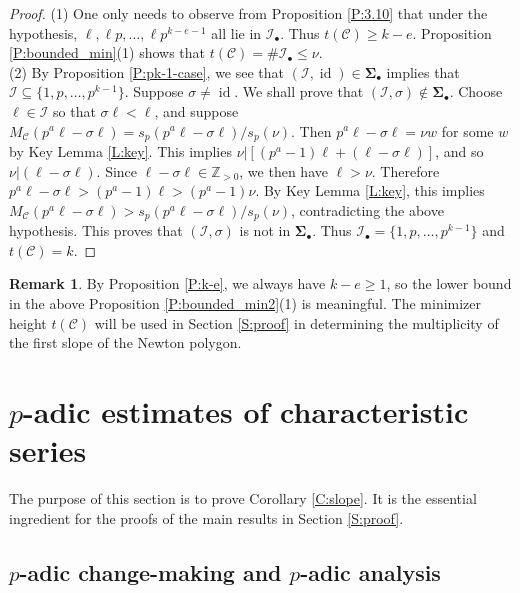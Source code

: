 \documentclass{amsart}
\numberwithin{equation}{section}
\newcommand{\Z}{\mathbb{Z}}
\newcommand{\bSig}{\mathbf\Sigma}
\newcommand{\Sb}{\bSig_\bullet}
\newcommand{\Ib}{\cI_\bullet}
\newcommand{\cC}{\mathcal{C}}
\newcommand{\cI}{\mathcal{I}}
\DeclareMathOperator{\id}{id}
\theoremstyle{plain}
\theoremstyle{definition}
\newtheorem*{remark*}{Remark}
\begin{document}
\begin{proof}
(1) 
One only needs to observe from Proposition \ref{P:3.10}
that under the hypothesis, 
$\ell,\ell p,\ldots,\ell p^{k-e-1}$ all lie in $\Ib$. Thus $t(\cC)\ge k-e$. 
Proposition \ref{P:bounded_min}(1) shows that  $t(\cC)=\#\Ib\le \nu$. 
\\
(2)
By Proposition \ref{P:pk-1-case}, we see that $(\cI,\id)\in\Sb$ 
implies that $\cI\subseteq \{1,p,\ldots,p^{k-1}\}$.
Suppose $\sigma\ne \id$.
We shall prove that $(\cI,\sigma)\not\in\Sb$.
Choose $\ell\in \cI$ so that 
$\sigma\ell<\ell$,
and suppose 
$M_\cC(p^a\ell-\sigma\ell)=s_p(p^a\ell-\sigma\ell)/s_p(\nu)$.
Then $p^a\ell-\sigma\ell=\nu w$ for some $w$ by Key Lemma
\ref{L:key}. 
This implies $\nu| [(p^a-1)\ell+(\ell-\sigma\ell)]$, and so
$\nu|(\ell-\sigma\ell)$. Since $\ell-\sigma\ell\in\Z_{>0}$,
we then have $\ell>\nu$. 
Therefore $p^a\ell-\sigma\ell>(p^a-1)\ell>(p^a-1)\nu$. By Key Lemma \ref{L:key}, this 
implies $M_\cC(p^a\ell-\sigma\ell)>s_p(p^a\ell-\sigma\ell)/s_p(\nu)$,
contradicting the above hypothesis.
This proves that $(\cI,\sigma)$ is not in $\Sb$.
Thus $\Ib=\{1,p,\ldots,p^{k-1}\}$ and $t(\cC)=k$.
\end{proof}

\begin{remark*}
By Proposition \ref{P:k-e}, we always have $k-e\ge 1$,
so the lower bound in the above Proposition \ref{P:bounded_min2}(1)
is meaningful. 
The minimizer height $t(\cC)$ will be used in Section 
\ref{S:proof}
in determining the multiplicity of the first slope of the Newton polygon. 
\end{remark*}


\section{\texorpdfstring{$p$}{p}-adic estimates of characteristic series}
\label{S:estimate}

The purpose of this section is to prove
Corollary \ref{C:slope}.
It is the essential ingredient for the proofs of the main results
in Section \ref{S:proof}.

\subsection{\texorpdfstring{$p$}{p}-adic change-making and 
\texorpdfstring{$p$}{p}-adic analysis}
\label{S:dwork}
\end{document}

